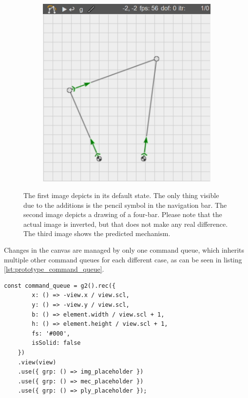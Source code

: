\begin{figure}
\begin{subfigure}[b]{0.32\textwidth}
        \caption{}
        \label{fig:prototype_drawing}
    \end{subfigure}
    \begin{subfigure}[b]{0.32\textwidth}
        \includegraphics[width=\textwidth]{images/prototype_after.png}
        \caption{}
        \label{fig:prototype_after}
    \end{subfigure}
    \caption[deepmech prototype.]{The first image depicts  in its default state. The only thing visible due to the additions is the pencil symbol in the navigation bar.
    The second image depicts a drawing of a four-bar. Please note that the actual image is inverted, but that does not make any real difference.
    The third image shows the predicted mechanism.}
    \label{fig:prototype}
\end{figure}

Changes in the canvas are managed by only one  command queue, which inherits multiple other command queues for each different case, as can be seen in listing \ref{lst:prototype_command_queue}.

\begin{lstlisting}[caption={Command queue for the drawing context in the prototype.}, label={lst:prototype_command_queue}]
const command_queue = g2().rec({
        x: () => -view.x / view.scl,
        y: () => -view.y / view.scl,
        b: () => element.width / view.scl + 1,
        h: () => element.height / view.scl + 1,
        fs: '#000',
        isSolid: false
    })
    .view(view)
    .use({ grp: () => img_placeholder })
    .use({ grp: () => mec_placeholder })
    .use({ grp: () => ply_placeholder });
\end{lstlisting}

